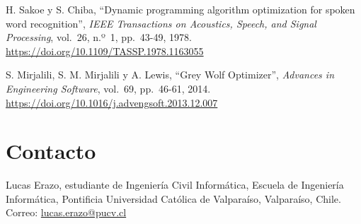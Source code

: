 \documentclass[11pt]{article}
\begin{document}
\begin{enumerate}[label={[\arabic*]}]
  \item H. Sakoe y S. Chiba, ``Dynamic programming algorithm optimization for spoken word recognition'', \emph{IEEE Transactions on Acoustics, Speech, and Signal Processing}, vol.~26, n.º~1, pp.~43-49, 1978. \url{https://doi.org/10.1109/TASSP.1978.1163055}
  \item S. Mirjalili, S. M. Mirjalili y A. Lewis, ``Grey Wolf Optimizer'', \emph{Advances in Engineering Software}, vol.~69, pp.~46-61, 2014. \url{https://doi.org/10.1016/j.advengsoft.2013.12.007}
\end{enumerate}

\section{Contacto}

Lucas Erazo, estudiante de Ingeniería Civil Informática, Escuela de Ingeniería Informática, Pontificia Universidad Católica de Valparaíso, Valparaíso, Chile. Correo: \href{mailto:lucas.erazo@pucv.cl}{lucas.erazo@pucv.cl}
\end{document}
